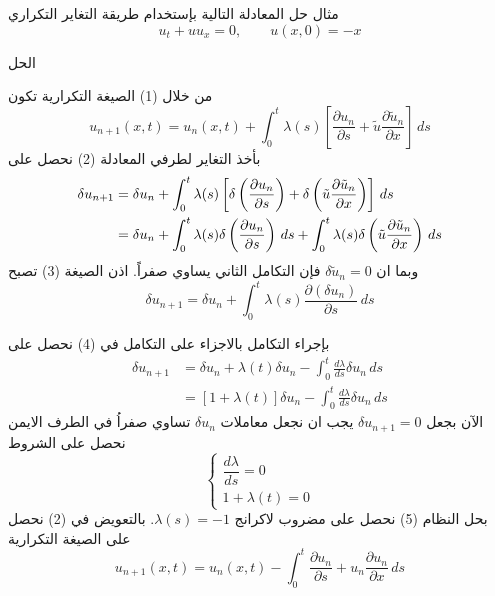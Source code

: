 	\begin{frame}
		\begin{exampleblock}{مثال}
				حل المعادلة التالية بإستخدام طريقة التغاير التكراري
			\[
			u_t + u u_x = 0 , \qquad u(x, 0) = -x
			\]
		\end{exampleblock}
		\begin{exampleblock}{الحل}
			
			من خلال (1) الصيغة التكرارية تكون 
			\begin{equation}
				u_{n+1}(x, t) = u_n(x, t) + \int_{0}^{t} \lambda(s) \left[\frac{\partial u_n}{\partial s} + \tilde{u}  \frac{\partial \tilde{u}_n}{\partial x}\right] \, ds 
			\end{equation}
			بأخذ التغاير لطرفي المعادلة (2) نحصل على
			\begin{align}
				\delta u_{n+1} &= \delta u_n + \int_{0}^{t} \lambda(s) \left[\delta\left(\frac{\partial u_n}{\partial s}\right) + \delta \left(\tilde{u}  \frac{\partial \tilde{u}_n}{\partial x}\right)\right]\, ds\notag\\
				&= \delta u_n + \int_{0}^t \lambda(s) \delta\left(\frac{\partial u_n}{\partial s}\right) \, ds + \int_{0}^{t} \lambda(s) \delta \left(\tilde{u}  \frac{\partial \tilde{u}_n}{\partial x}\right) \, ds
			\end{align}
			وبما ان $\delta\tilde{u}_n = 0$ فإن التكامل الثاني يساوي صفراً. اذن الصيغة (3) تصبح 
			\begin{equation}
				\delta u_{n+1} = \delta u_n + \int_{0}^{t} \lambda(s) \frac{\partial(\delta u_n)}{\partial s} \, ds
			\end{equation} 
		\end{exampleblock}
	\end{frame}
	
	\begin{frame}
		\begin{exampleblock}{}
			بإجراء التكامل بالاجزاء على التكامل في (4) نحصل على
			\begin{align*}
				\delta u_{n+1} &= \delta u_n + \lambda(t) \delta u_n - \int_0^t \frac{d \lambda}{ds} \delta u_n \, ds\\
				&= [1 + \lambda(t)] \delta u_n - \int_0^t \frac{d \lambda}{ds} \delta u_n \, ds
			\end{align*}
			الآن بجعل $\delta u_{n+1} = 0$ يجب ان نجعل معاملات $\delta u_n$ تساوي صفراُ في الطرف الايمن نحصل على الشروط
			\begin{equation}
				\begin{cases}
					\dfrac{d \lambda}{ds} = 0 \\
					1 + \lambda(t) = 0
				\end{cases}
			\end{equation}
			بحل النظام (5) نحصل على مضروب لاكرانج $\lambda(s) = -1$. بالتعويض في (2) نحصل على الصيغة التكرارية 
			\begin{equation}
				u_{n+1}(x, t) = u_n(x, t) - \int_{0}^{t} \frac{\partial u_n}{\partial s} + {u}_n  \frac{\partial {u}_n}{\partial x}\, ds 
			\end{equation}
		\end{exampleblock}
	\end{frame}
	
